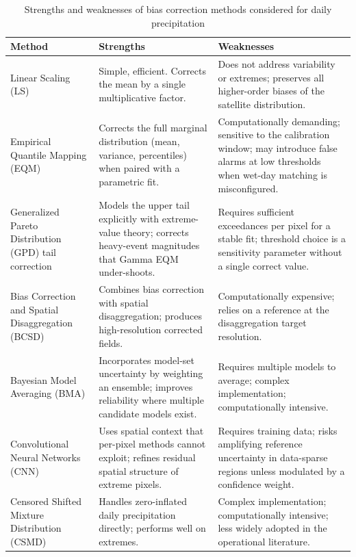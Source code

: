 \begin{table}[H]
\centering
\caption[Strengths and weaknesses of bias correction methods considered for daily precipitation]{Strengths and weaknesses of bias correction methods
considered for daily precipitation\label{tab:biascorr-methods}}
\begingroup\footnotesize
\begin{tabular}{@{}p{3.0cm} p{5.0cm} p{5.0cm}@{}}
\toprule
Method & Strengths & Weaknesses \\
\midrule
Linear Scaling (LS) &
Simple, efficient. Corrects the mean by a single
multiplicative factor. &
Does not address variability or extremes; preserves all
higher-order biases of the satellite distribution. \\
\addlinespace
Empirical Quantile Mapping (EQM) &
Corrects the full marginal distribution (mean, variance,
percentiles) when paired with a parametric fit. &
Computationally demanding; sensitive to the calibration window;
may introduce false alarms at low thresholds when wet-day
matching is misconfigured. \\
\addlinespace
Generalized Pareto Distribution (GPD) tail correction &
Models the upper tail explicitly with extreme-value theory;
corrects heavy-event magnitudes that Gamma EQM under-shoots. &
Requires sufficient exceedances per pixel for a stable fit;
threshold choice is a sensitivity parameter without a single
correct value. \\
\addlinespace
Bias Correction and Spatial Disaggregation (BCSD) &
Combines bias correction with spatial disaggregation; produces
high-resolution corrected fields. &
Computationally expensive; relies on a reference at the
disaggregation target resolution. \\
\addlinespace
Bayesian Model Averaging (BMA) &
Incorporates model-set uncertainty by weighting an ensemble;
improves reliability where multiple candidate models exist. &
Requires multiple models to average; complex implementation;
computationally intensive. \\
\addlinespace
Convolutional Neural Networks (CNN) &
Uses spatial context that per-pixel methods cannot exploit;
refines residual spatial structure of extreme pixels. &
Requires training data; risks amplifying reference uncertainty
in data-sparse regions unless modulated by a confidence weight. \\
\addlinespace
Censored Shifted Mixture Distribution (CSMD) &
Handles zero-inflated daily precipitation directly; performs
well on extremes. &
Complex implementation; computationally intensive; less widely
adopted in the operational literature. \\
\bottomrule
\end{tabular}
\endgroup
\end{table}

